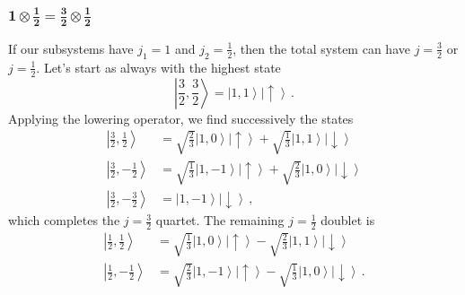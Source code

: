 \documentclass{article}
\theoremstyle{plain}\theoremheaderfont{\normalfont\itshape}\theorembodyfont{\rmfamily}\theoremseparator{.}\newtheorem*{rem}{Remark}\newtheorem*{ex}{Example}\newtheorem*{proof}{Proof}\newtheorem*{altp}{Alternative proof}
\theoremstyle{plain}\theoremheaderfont{\normalfont\bfseries}\theorembodyfont{\rmfamily}\theoremseparator{.}\newtheorem{thm}{Theorem}[section]\newtheorem{lem}[thm]{Lemma}\newtheorem{prop}[thm]{Proposition}\newtheorem*{cor}{Corollary}\newtheorem{defn}[thm]{Definition}\newtheorem{clm}[thm]{Claim}\newtheorem{clminproof}{Claim}
\theoremstyle{break}\theoremheaderfont{\normalfont\itshape}\theorembodyfont{\rmfamily}\theoremseparator{.\medskip}\newtheorem*{proofskip}{Proof}\newtheorem*{exs}{Examples}\newtheorem*{rems}{Remarks}
\theoremstyle{break}\theoremheaderfont{\normalfont\bfseries}\theorembodyfont{\rmfamily}\theoremseparator{.\medskip}\newtheorem{lemskip}[thm]{Lemma}\newtheorem{defnskip}[thm]{Definition}\newtheorem{propskip}[thm]{Proposition}\newtheorem{thmskip}[thm]{Theorem}
\numberwithin{equation}{section}
\newcommand{\ket}[1]{\left| #1 \right\rangle}
\begin{document}
    \subsubsection{\texorpdfstring{\(\bm{1\otimes\frac{1}{2}=\frac{3}{2}\otimes\frac{1}{2}}\)}{1 * 1/2 = 3/2 + 1/2}}
    If our subsystems have \(j_1=1\) and \(j_2=\frac{1}{2}\), then the total system can have \(j=\frac{3}{2}\) or \(j=\frac{1}{2}\). Let's start as always with the highest state
    \begin{equation}
        \ket{\frac{3}{2},\frac{3}{2}}=\ket{1,1}\ket{\uparrow}\,.
    \end{equation}
    Applying the lowering operator, we find successively the states
    \begin{align}
        \ket{\frac{3}{2},\frac{1}{2}}&=\sqrt{\frac{2}{3}}\ket{1,0}\ket{\uparrow}+\sqrt{\frac{1}{3}}\ket{1,1}\ket{\downarrow}\\
        \ket{\frac{3}{2},-\frac{1}{2}}&=\sqrt{\frac{1}{3}}\ket{1,-1}\ket{\uparrow}+\sqrt{\frac{2}{3}}\ket{1,0}\ket{\downarrow}\\
        \ket{\frac{3}{2},-\frac{3}{2}}&=\ket{1,-1}\ket{\downarrow}\,,
    \end{align}
    which completes the \(j=\frac{3}{2}\) quartet. The remaining \(j=\frac{1}{2}\) doublet is
    \begin{align}
        \ket{\frac{1}{2},\frac{1}{2}}&=\sqrt{\frac{1}{3}}\ket{1,0}\ket{\uparrow}-\sqrt{\frac{2}{3}}\ket{1,1}\ket{\downarrow}\\
        \ket{\frac{1}{2},-\frac{1}{2}}&=\sqrt{\frac{2}{3}}\ket{1,-1}\ket{\uparrow}-\sqrt{\frac{1}{3}}\ket{1,0}\ket{\downarrow}\,.
    \end{align}
\end{document}

